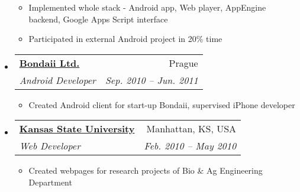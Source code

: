 \documentclass[letterpaper,11pt]{article}
\makeatletter
\newcommand{\resitem}[1]{\item #1 \vspace{-2pt}}
\newcommand{\ressubheading}[4]{
\begin{tabular*}{6.5in}{l@{\extracolsep{\fill}}r}
		\textbf{#1} & #2 \\
		\textit{#3} & \textit{#4} \\
\end{tabular*}\vspace{-6pt}}
\makeatother
\begin{document}
\begin{itemize}
{\begin{itemize}
					\resitem{Implemented whole stack - Android app, Web player, AppEngine backend, Google Apps Script interface}
					\resitem{Participated in external Android project in 20\% time}
				\end{itemize}
				}
	    \item 
			\ressubheading{\href{http://www.bondaii.com}{Bondaii Ltd.}}{Prague}{Android Developer}{Sep. 2010 -- Jun. 2011}
				{ \footnotesize
				\begin{itemize}
					\resitem{Created Android client for start-up Bondaii, supervised iPhone developer}
				\end{itemize}
				}
	    \item 
			\ressubheading{\href{http://www.k-state.edu}{Kansas State University}}{Manhattan, KS, USA}{Web Developer}{Feb. 2010 -- May 2010}
				{ \footnotesize
				\begin{itemize}
					\resitem{Created webpages for research projects of Bio \& Ag Engineering Department}
				\end{itemize}
				}

	\end{itemize}  %
	
\end{document}
